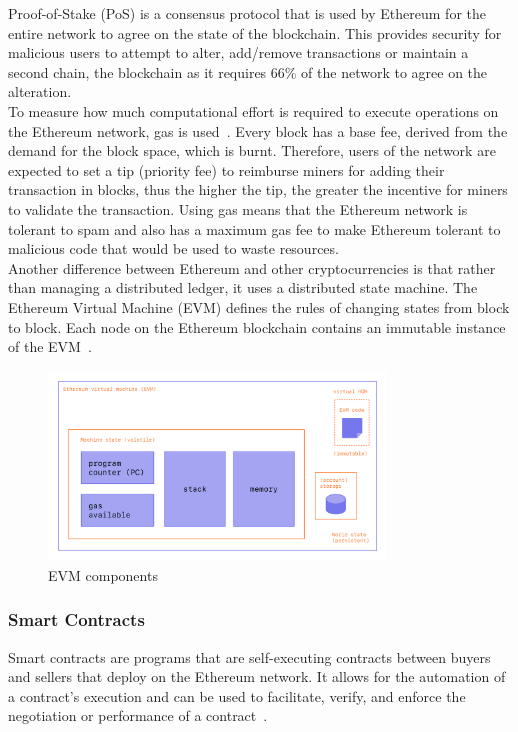 \noindent Proof-of-Stake (PoS) is a consensus protocol that is used by Ethereum for the entire network to agree on the state of the blockchain. This provides security for malicious users to attempt to alter, add/remove transactions or maintain a second chain, the blockchain as it requires 66\% of the network to agree on the alteration.
\\[5mm]
To measure how much computational effort is required to execute operations on the Ethereum network, gas is used~\cite{noauthor_gas_nodate}. Every block has a base fee, derived from the demand for the block space, which is burnt. Therefore, users of the network are expected to set a tip (priority fee) to reimburse miners for adding their transaction in blocks, thus the higher the tip, the greater the incentive for miners to validate the transaction. Using gas means that the Ethereum network is tolerant to spam and also has a maximum gas fee to make Ethereum tolerant to malicious code that would be used to waste resources.
\\[5mm]
Another difference between Ethereum and other cryptocurrencies is that rather than managing a distributed ledger, it uses a distributed state machine. The Ethereum Virtual Machine (EVM) defines the rules of changing states from block to block. Each node on the Ethereum blockchain contains an immutable instance of the EVM~\cite{noauthor_ethereum_nodate}.

\begin{figure}[!htb]
    \centering
    \includegraphics[width=0.8\textwidth]{background/Images/evm.png}
    \caption{EVM components~\cite{noauthor_ethereum_nodate}}
\end{figure}

\subsubsection{Smart Contracts}
Smart contracts are programs that are self-executing contracts between buyers and sellers that deploy on the Ethereum network. It allows for the automation of a contract's execution and can be used to facilitate, verify, and enforce the negotiation or performance of a contract~\cite{noauthor_introduction_nodate, noauthor_smart_nodate}.

